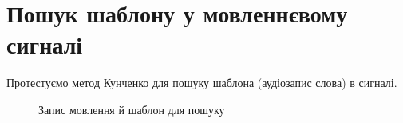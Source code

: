 \section{Пошук шаблону у мовленнєвому сигналі}
Протестуємо метод Кунченко для пошуку шаблона (аудіозапис слова) в сигналі.
\begin{figure}[!h]
    \centering
    \caption{Запис мовлення й шаблон для пошуку}\label{fig:audio}
\end{figure}

